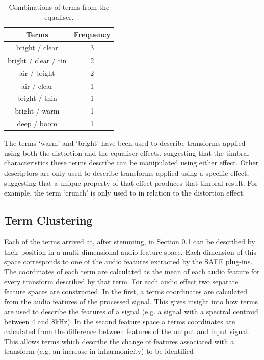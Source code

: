 		\begin{table}[h!]
			\centering
			\begin{tabular}{|c|c|}
				\hline
				\bf{Terms} & \bf{Frequency} \tabularnewline
				\hline
				\hline
				bright / clear & 3 \tabularnewline
				\hline
				bright / clear / tin & 2 \tabularnewline
				\hline
				air / bright & 2 \tabularnewline
				\hline
				air / clear & 1 \tabularnewline
				\hline
				bright / thin & 1 \tabularnewline
				\hline
				bright / warm & 1 \tabularnewline
				\hline
				deep / boom & 1 \tabularnewline
				\hline
			\end{tabular}
			\caption{Combinations of terms from the equaliser.}
			\label{tab:EqualiserTermCombinations}
		\end{table}

		The terms `warm' and `bright' have been used to describe transforms applied using both the distortion and
		the equaliser effects, suggesting that the timbral characteristics these terms describe can be manipulated
		using either effect. Other descriptors are only used to describe transforms applied using a specific
		effect, suggesting that a unique property of that effect produces that timbral result. For example, the
		term `crunch' is only used to in relation to the distortion effect.

	\subsection{Term Clustering}
	\label{sec:TimbreEvaluation-Analysis-TermClustering}
		Each of the terms arrived at, after stemming, in Section \ref{sec:TimbreEvaluation-Analysis-TermClustering}
		can be described by their position in a multi dimensional audio feature space. Each dimension of this space
		corresponds to one of the audio features extracted by the SAFE plug-ins. The coordinates of each term are
		calculated as the mean of each audio feature for every transform described by that term. For each audio
		effect two separate feature spaces are constructed. In the first, a terms coordinates are calculated from
		the audio features of the processed signal. This gives insight into how terms are used to describe the
		features of a signal (e.g. a signal with a spectral centroid between 4 and 8kHz). In the second feature
		space a terms coordinates are calculated from the difference between features of the output and input
		signal. This allows terms which describe the change of features associated with a transform (e.g. an
		increase in inharmonicity) to be identified

